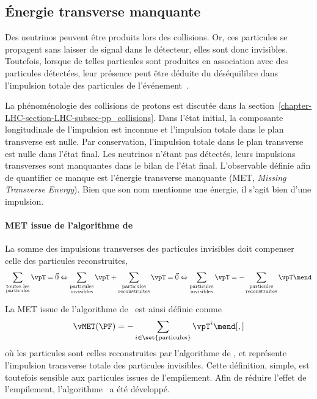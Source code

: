 \subsection{Énergie transverse manquante}\label{chapter-CMS-section-MET}
Des neutrinos peuvent être produits lors des collisions.
Or, ces particules se propagent sans laisser de signal dans le détecteur, elles sont donc invisibles.
Toutefois, lorsque de telles particules sont produites en association avec des particules détectées, leur présence peut être déduite du déséquilibre dans l'impulsion totale des particules de l'événement~\cite{CMS-PAS-JME-17-001}.
\par
La phénoménologie des collisions de protons est discutée dans la section~\ref{chapter-LHC-section-LHC-subsec-pp_collisions}.
Dans l'état initial,
la composante longitudinale de l'impulsion est inconnue
et
l'impulsion totale dans le plan transverse est nulle.
Par conservation, l'impulsion totale dans le plan transverse est nulle dans l'état final.
Les neutrinos n'étant pas détectés, leurs impulsions transverses sont manquantes dans le bilan de l'état final.
L'observable définie afin de quantifier ce manque est
l'énergie transverse manquante (MET, \emph{Missing Transverse Energy}).
Bien que son nom mentionne une énergie, il s'agit bien d'une impulsion.
\par
\paragraph{MET issue de l'algorithme de \PF}
La somme des impulsions transverses des particules invisibles doit compenser celle des particules reconstruites, \ie
\begin{equation}
\sum_{\substack{\text{toutes les}\\\text{particules}}} \vpT = \vec{0}
\Leftrightarrow
\sum_{\substack{\text{particules}\\\text{invisibles}}} \vpT + \sum_{\substack{\text{particules}\\\text{reconstruites}}} \vpT = \vec{0}
\Leftrightarrow
\sum_{\substack{\text{particules}\\\text{invisibles}}} \vpT = -\sum_{\substack{\text{particules}\\\text{reconstruites}}} \vpT \mend
\end{equation}
\par La MET issue de l'algorithme de \PF\ est ainsi définie comme
\begin{equation}
\vMET(\text{\PF}) = -\sum_{i\in\set{\text{particules}}} \vpT^{i}
\mend[,]
\end{equation}
où les particules sont celles reconstruites par l'algorithme de \PF,
et représente l'impulsion transverse totale des particules invisibles.
Cette définition, simple, est toutefois sensible aux particules issues de l'empilement.
Afin de réduire l'effet de l'empilement, l'algorithme \PUPPI\ a été développé.
